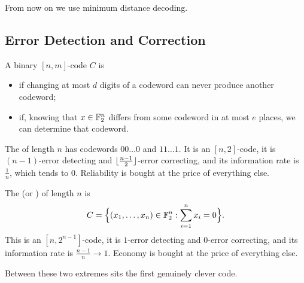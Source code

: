 \documentclass[a4paper]{scrartcl}
\DeclarePairedDelimiter{\floor}{\lfloor}{\rfloor}
\begin{document}
From now on we use minimum distance decoding.

\subsection{Error Detection and Correction}

\begin{definition}
	A binary $[n,m]$-code $C$ is
	\begin{itemize}
		\item {} if changing at most $d$ digits of a codeword can never produce another codeword;
		\item {} if, knowing that $x \in \mathbb{F}_2^n$ differs from some codeword in at most $e$ places, we can determine that codeword.
	\end{itemize}
\end{definition}

\begin{example}
	The  of length $n$ has codewords $00\dots0$ and $11\dots1$. It is an $[n,2]$-code, it is $(n-1)$-error detecting and $\floor{\frac{n-1}{2}}$-error correcting, and its information rate is $\frac1n$, which tends to $0$. Reliability is bought at the price of everything else.
\end{example}

\begin{example}
	The  (or ) of length $n$ is
	$$C = \Bigl\{(x_1, \dots, x_n) \in \mathbb{F}_2^n : \sum_{i=1}^n x_i = 0\Bigr\}.$$
	This is an $[n, 2^{n-1}]$-code, it is $1$-error detecting and $0$-error correcting, and its information rate is $\frac{n-1}{n} \to 1$. Economy is bought at the price of everything else.
\end{example}

Between these two extremes sits the first genuinely clever code.
\end{document}
